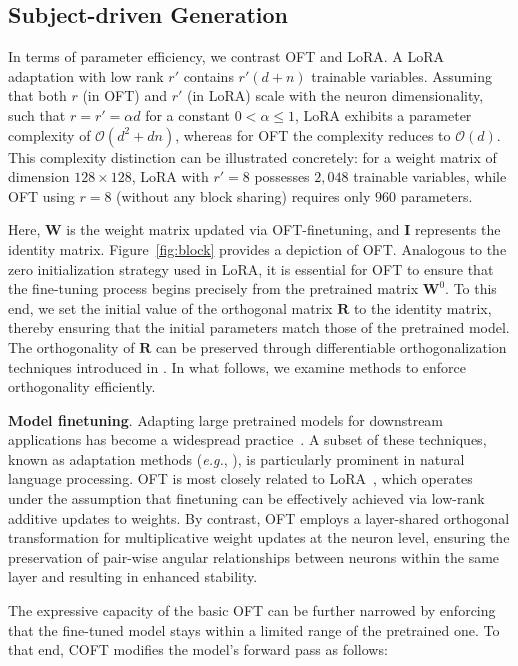 \begin{itemize}[leftmargin=*,nosep]
\subsection{Subject-driven Generation}

In terms of parameter efficiency, we contrast OFT and LoRA. A LoRA adaptation with low rank $r'$ contains $r'(d+n)$ trainable variables. Assuming that both $r$ (in OFT) and $r'$ (in LoRA) scale with the neuron dimensionality, such that $r = r' = \alpha d$ for a constant $0 < \alpha \leq 1$, LoRA exhibits a parameter complexity of $\mathcal{O}(d^2 + dn)$, whereas for OFT the complexity reduces to $\mathcal{O}(d)$. This complexity distinction can be illustrated concretely: for a weight matrix of dimension $128\times 128$, LoRA with $r'=8$ possesses $2,048$ trainable variables, while OFT using $r=8$ (without any block sharing) requires only $960$ parameters.

Here, $\bm{W}$ is the weight matrix updated via OFT-finetuning, and $\bm{I}$ represents the identity matrix. Figure~\ref{fig:block} provides a depiction of OFT. Analogous to the zero initialization strategy used in LoRA, it is essential for OFT to ensure that the fine-tuning process begins precisely from the pretrained matrix $\bm{W}^0$. To this end, we set the initial value of the orthogonal matrix $\bm{R}$ to the identity matrix, thereby ensuring that the initial parameters match those of the pretrained model. The orthogonality of $\bm{R}$ can be preserved through differentiable orthogonalization techniques introduced in \cite{liu2021orthogonal,lezcano2019cheap}. In what follows, we examine methods to enforce orthogonality efficiently.

\textbf{Model finetuning}. Adapting large pretrained models for downstream applications has become a widespread practice~\cite{devlin2018bert,brown2020language,he2022masked}. A subset of these techniques, known as adaptation methods (\emph{e.g.}, \cite{hulora2022,houlsby2019parameter,pfeiffer2020adapterfusion}), is particularly prominent in natural language processing. OFT is most closely related to LoRA~\cite{hulora2022}, which operates under the assumption that finetuning can be effectively achieved via low-rank additive updates to weights. By contrast, OFT employs a layer-shared orthogonal transformation for multiplicative weight updates at the neuron level, ensuring the preservation of pair-wise angular relationships between neurons within the same layer and resulting in enhanced stability.

The expressive capacity of the basic OFT can be further narrowed by enforcing that the fine-tuned model stays within a limited range of the pretrained one. To that end, COFT modifies the model’s forward pass as follows:


\end{itemize}
